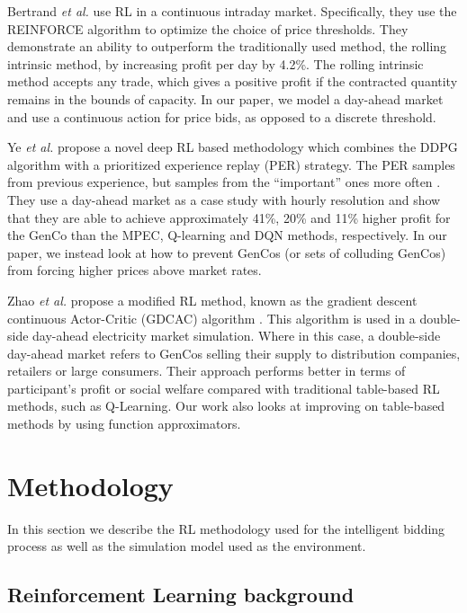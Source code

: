 Bertrand \textit{et al.} use RL in a continuous intraday market. Specifically, they use the REINFORCE algorithm to optimize the choice of price thresholds. They demonstrate an ability to outperform the traditionally used method, the rolling intrinsic method, by increasing profit per day by 4.2\%. The rolling intrinsic method accepts any trade, which gives a positive profit if the contracted quantity remains in the bounds of capacity. In our paper, we model a day-ahead market and use a continuous action for price bids, as opposed to a discrete threshold.

Ye \textit{et al.} propose a novel deep RL based methodology which combines the DDPG algorithm with a prioritized experience replay (PER) strategy. The PER samples from previous experience, but samples from the ``important'' ones more often \cite{Schaul2016}. They use a day-ahead market as a case study with hourly resolution and show that they are able to achieve approximately 41\%, 20\% and 11\% higher profit for the GenCo than the MPEC, Q-learning and DQN methods, respectively. In our paper, we instead look at how to prevent GenCos (or sets of colluding GenCos) from forcing higher prices above market rates.



Zhao \textit{et al.} propose a modified RL method, known as the gradient descent continuous Actor-Critic (GDCAC) algorithm \cite{Zhao2016}. This algorithm is used in a double-side day-ahead electricity market simulation. Where in this case, a double-side day-ahead market refers to GenCos selling their supply to distribution companies, retailers or large consumers. Their approach performs better in terms of participant's profit or social welfare compared with traditional table-based RL methods, such as Q-Learning. Our work also looks at improving on table-based methods by using function approximators.





\section{Methodology}
\label{sec:material}

In this section we describe the RL methodology used for the intelligent bidding process as well as the simulation model used as the environment.

\subsection{Reinforcement Learning background}

